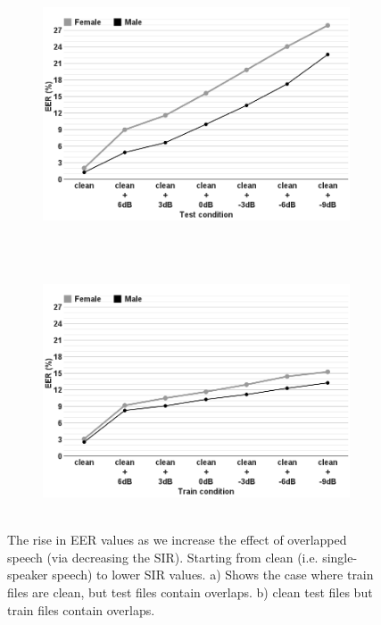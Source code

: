 {\begin{figure}[t!]
	\centering
	\begin{subfigure}[t]{0.5\textwidth}
		\includegraphics[width=\textwidth]{figures/sidingrid_ovlintest}
		\vspace{-1mm}
		\caption{~}
		\label{fig:sidingrid_ovlintest_train_a}
	\end{subfigure}%
	~ %
	\begin{subfigure}[t]{0.5\textwidth}
		\includegraphics[width=\textwidth]{figures/sidingrid_ovlintrain}
		\vspace{-1mm}
		\caption{~}
		\label{fig:sidingrid_ovlintest_train_b}
	\end{subfigure}
	\vspace{-3.6mm}
	\caption{The rise in EER values as we increase the effect of overlapped speech (via decreasing the SIR). Starting from clean (i.e. single-speaker speech) to lower SIR values. a) Shows the case where train files are clean, but test files contain overlaps.  b) clean test files but train files contain overlaps.}
	\vspace{-1.2mm}
\end{figure}


}
